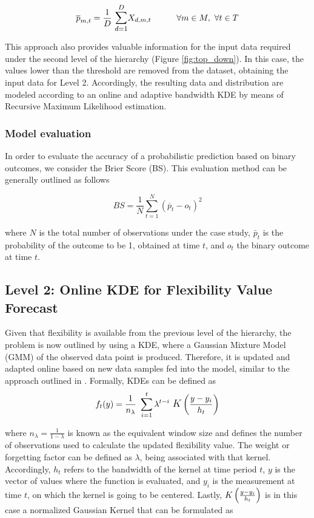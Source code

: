 \begin{equation}
    \overline{p}_{m,t} = \frac{1}{D} \ \mathlarger{\sum_{d=1}^{D}} X_{d,m,t} \hspace{30pt} \forall m \in M, \ \forall t \in T
\end{equation}

This approach also provides valuable information for the input data required under the second level of the hierarchy (Figure \ref{fig:top_down}). In this case, the values lower than the threshold are removed from the dataset, obtaining the input data for Level 2. Accordingly, the resulting data and distribution are modeled according to an online and adaptive bandwidth KDE by means of Recursive Maximum Likelihood estimation.


\subsubsection{Model evaluation}

In order to evaluate the accuracy of a probabilistic prediction based on binary outcomes, we consider the Brier Score (BS). This evaluation method can be generally outlined as follows

\begin{equation}
    BS = \frac{1}{N} \sum_{t=1}^{N} (\overline{p}_{t} - o_{t})^2
\end{equation}


where $N$ is the total number of observations under the case study, $\bar{p}_{t}$ is the probability of the outcome to be 1, obtained at time $t$, and $o_{t}$ the binary outcome at time $t$.
\subsection{Level 2: Online KDE for Flexibility Value Forecast}
Given that flexibility is available from the previous level of the hierarchy, the problem is now outlined by using a KDE, where a Gaussian Mixture Model (GMM) \cite{Silverman1986} of the observed data point is produced. Therefore, it is updated and adapted online based on new data samples fed into the model, similar to the approach outlined in \cite{Kristan2010,Pinson2012}. Formally, KDEs can be defined as
\begin{equation}
    f_{t}(y)= \frac{1}{n_{\lambda}} \ \sum_{i=1}^{t} \lambda^{t-i} \ \mathlarger{K}\left(\frac{y - y_{i}}{h_{t}}\right) 
\end{equation}

where $n_{\lambda} = \frac{1}{1-\lambda}$ is known as the equivalent window size and defines the number of observations used to calculate the updated flexibility value. The weight or forgetting factor can be defined as $\lambda$, being associated with that kernel. Accordingly, $h_{t}$ refers to the bandwidth of the kernel at time period $t$, $y$ is the vector of values where the function is evaluated, and $y_{i}$ is the measurement at time $t$, on which the kernel is going to be centered. Lastly, $\mathlarger{K}\left(\frac{y - y_{i}}{h_{t}}\right)$ is in this case a normalized Gaussian Kernel that can be formulated as

